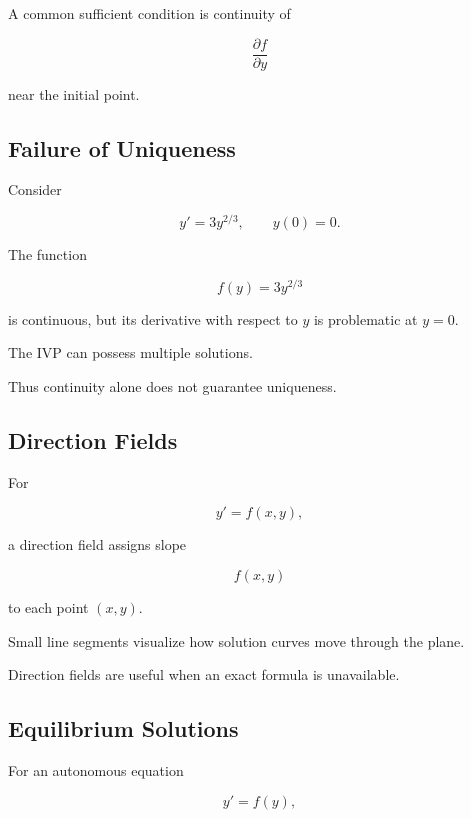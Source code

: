 A common sufficient condition is continuity of

\[
\frac{\partial f}{\partial y}
\]

near the initial point.

\subsection{Failure of Uniqueness}
\label{subsec:failure-uniqueness-ode}

Consider

\[
\boxed{
y'
=
3y^{2/3},
\qquad
y(0)=0.
}
\]

The function

\[
f(y)=3y^{2/3}
\]

is continuous, but its derivative with respect to \(y\) is problematic at
\(y=0\).

The IVP can possess multiple solutions.

Thus continuity alone does not guarantee uniqueness.

\subsection{Direction Fields}
\label{subsec:direction-fields}

For

\[
y'=f(x,y),
\]

a direction field assigns slope

\[
\boxed{
f(x,y)
}
\]

to each point \((x,y)\).

Small line segments visualize how solution curves move through the plane.

Direction fields are useful when an exact formula is unavailable.

\subsection{Equilibrium Solutions}
\label{subsec:equilibrium-solutions}

For an autonomous equation

\[
y'=f(y),
\]

